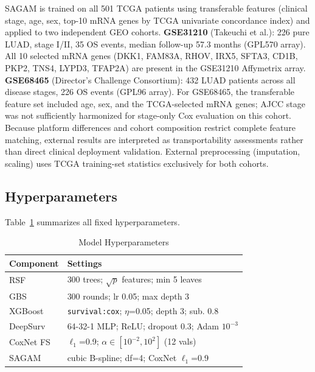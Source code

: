 \documentclass[conference]{IEEEtran}
\begin{document}
SAGAM is trained on all 501 TCGA patients using transferable features
(clinical stage, age, sex, top-10 mRNA genes by TCGA univariate concordance
index) and applied to two independent GEO cohorts.
\textbf{GSE31210} (Takeuchi et al.): 226 pure LUAD, stage I/II,
35 OS events, median follow-up 57.3 months (GPL570 array).
All 10 selected mRNA genes (DKK1, FAM83A, RHOV, IRX5, SFTA3, CD1B,
PKP2, TNS4, LYPD3, TFAP2A) are present in the GSE31210 Affymetrix array.
\textbf{GSE68465} (Director's Challenge Consortium): 432 LUAD patients
across all disease stages, 226 OS events (GPL96 array).
For GSE68465, the transferable feature set included age, sex, and the
TCGA-selected mRNA genes; AJCC stage was not sufficiently harmonized for
stage-only Cox evaluation on this cohort.
Because platform differences and cohort composition restrict complete
feature matching, external results are interpreted as transportability
assessments rather than direct clinical deployment validation.
External preprocessing (imputation, scaling) uses TCGA training-set
statistics exclusively for both cohorts.

\subsection{Hyperparameters}

Table~\ref{tab:hyperparams} summarizes all fixed hyperparameters.

\begin{table}[t]
\caption{Model Hyperparameters}
\label{tab:hyperparams}
\begin{center}
\begin{tabular}{ll}
\toprule
\textbf{Component} & \textbf{Settings} \\
\midrule
RSF        & 300 trees; $\sqrt{p}$ features; min 5 leaves \\
GBS        & 300 rounds; lr 0.05; max depth 3 \\
XGBoost    & \texttt{survival:cox}; $\eta$=0.05; depth 3; sub. 0.8 \\
DeepSurv   & 64-32-1 MLP; ReLU; dropout 0.3; Adam $10^{-3}$ \\
CoxNet FS  & $\ell_1$=0.9; $\alpha\in[10^{-2},10^2]$ (12 vals) \\
SAGAM      & cubic B-spline; df=4; CoxNet $\ell_1$=0.9 \\
\bottomrule
\end{tabular}
\end{center}
\end{table}
\end{document}

